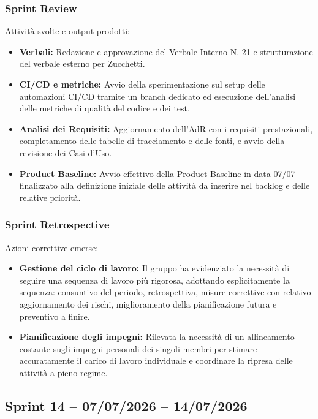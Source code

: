 \subsubsection{Sprint Review}
Attività svolte e output prodotti:
\begin{itemize}
    \item \textbf{Verbali:} Redazione e approvazione del Verbale Interno N. 21 e strutturazione del verbale esterno per Zucchetti.
    \item \textbf{CI/CD e metriche:} Avvio della sperimentazione sul setup delle automazioni CI/CD tramite un branch dedicato ed esecuzione dell'analisi delle metriche di qualità del codice e dei test.
    \item \textbf{Analisi dei Requisiti:} Aggiornamento dell'AdR con i requisiti prestazionali, completamento delle tabelle di tracciamento e delle fonti, e avvio della revisione dei Casi d'Uso.
    \item \textbf{Product Baseline:} Avvio effettivo della Product Baseline in data 07/07 finalizzato alla definizione iniziale delle attività da inserire nel backlog e delle relative priorità.
\end{itemize}

\subsubsection{Sprint Retrospective}
Azioni correttive emerse:
\begin{itemize}
    \item \textbf{Gestione del ciclo di lavoro:} Il gruppo ha evidenziato la necessità di seguire una sequenza di lavoro più rigorosa, adottando esplicitamente la sequenza: consuntivo del periodo, retrospettiva, misure correttive con relativo aggiornamento dei rischi, miglioramento della pianificazione futura e preventivo a finire.
    \item \textbf{Pianificazione degli impegni:} Rilevata la necessità di un allineamento costante sugli impegni personali dei singoli membri per stimare accuratamente il carico di lavoro individuale e coordinare la ripresa delle attività a pieno regime.
\end{itemize}


\subsection{Sprint 14 -- 07/07/2026 -- 14/07/2026}
\label{sec:sprint14}


